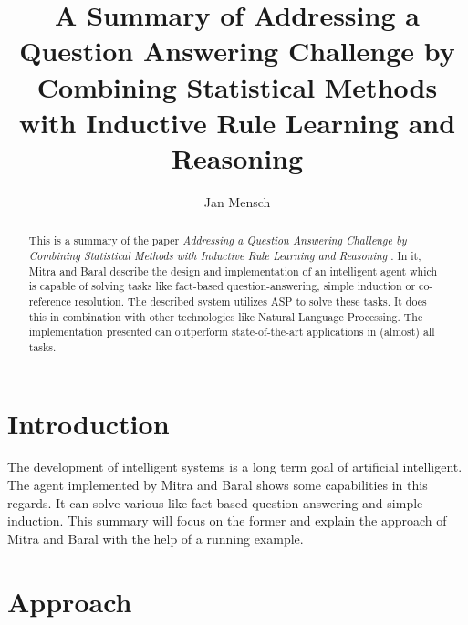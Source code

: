 \documentclass[runningheads]{llncs}
\newcommand{\papertitle}{Addressing a Question Answering Challenge by Combining Statistical Methods with Inductive Rule Learning and Reasoning}
\newcommand{\authorquote}{Mitra and Baral}
\begin{document}
\title{A Summary of \papertitle}

\author{Jan Mensch}




%
\maketitle              %
%



\begin{abstract}
This is a summary of the paper \textit{\papertitle} \cite{mitra2016addressing}. In it, \authorquote{} describe the design and implementation of an intelligent agent which is capable of solving tasks like fact-based question-answering, simple induction or co-reference resolution. The described system utilizes ASP to solve these tasks. It does this in combination with other technologies like Natural Language Processing. The implementation presented can outperform state-of-the-art applications in (almost) all tasks. 
\end{abstract}



\section{Introduction} \label{sec:intro}


The development of intelligent systems is a long term goal of artificial intelligent. The agent implemented by \authorquote{} shows some capabilities in this regards. It can solve various like fact-based question-answering and simple induction. This summary will focus on the former and explain the approach of \authorquote{} with the help of a running example.  




\section{Approach}
\end{document}
